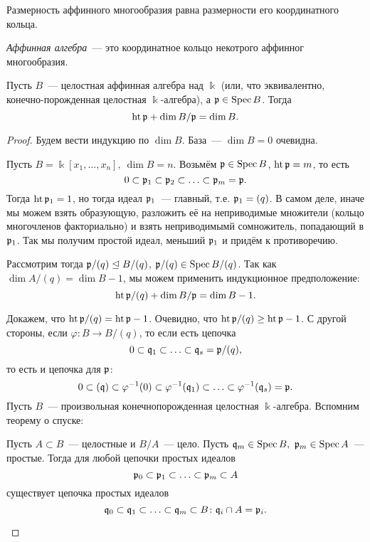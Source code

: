 
	\begin{remark}
		Размерность аффинного многообразия равна размерности его координатного кольца. 
	\end{remark}

	\begin{definition} 
		\emph{Аффинная алгебра}~--- это координатное кольцо некотрого аффинног многообразия. 
	\end{definition}

	\begin{theorem}\label{ht(p) + dim(B/p)} 
		Пусть $B$~--- целостная аффинная алгебра над $\Bbbk$ (или, что эквивалентно, конечно-порожденная целостная $\Bbbk$-алгебра), а $\mathfrak{p} \in \operatorname{Spec}{B}$. Тогда 
		\[
			\operatorname{ht}{\mathfrak{p}} + \dim{B/\mathfrak{p}} = \dim{B}.
		\]
	\end{theorem}
	\begin{proof}
		Будем вести индукцию по $\dim{B}$. База~--- $\dim{B} = 0$ очевидна. 

		 Пусть $B = \Bbbk[x_1, \ldots, x_n], \ \dim{B} = n$. Возьмём $\mathfrak{p} \in \operatorname{Spec}{B}$, $\operatorname{ht}{\mathfrak{p}} = m$, то есть 
		\[
			0 \subset \mathfrak{p}_1 \subset \mathfrak{p}_2 \subset \ldots \subset \mathfrak{p}_m = \mathfrak{p}.
		\]
		Тогда $\operatorname{ht}{\mathfrak{p}_1} = 1$, но тогда идеал $\mathfrak{p}_1$~--- главный, т.е. $\mathfrak{p}_1 = (q)$. В самом деле, иначе мы можем взять образующую, разложить её на неприводимые множители (кольцо многочленов факториально) и взять неприводимымй сомножитель, попадающий в $\mathfrak{p}_1$. Так мы получим простой идеал, меньший $\mathfrak{p}_1$ и придём к противоречию. 

		Рассмотрим тогда $\mathfrak{p}/(q) \trianglelefteq B/(q)$, $\mathfrak{p}/(q) \in \operatorname{Spec}{B/(q)}$. Так как $\dim{A/(q)} = \dim{B} - 1$, мы можем применить индукционное предположение: 
		\[
			\operatorname{ht}{\mathfrak{p}/(q)} + \dim{B/\mathfrak{p}} = \dim{B} - 1. 
		\]

		Докажем, что $\operatorname{ht}{\mathfrak{p}/(q)} = \operatorname{ht}{\mathfrak{p}} - 1$. Очевидно, что $\operatorname{ht}{\mathfrak{p}/(q)} \ge \operatorname{ht}{\mathfrak{p}} - 1$. С другой стороны, если $\varphi\colon B \to B/(q)$, то если есть цепочка 
		\[
			0 \subset \mathfrak{q}_1 \subset \ldots \subset \mathfrak{q}_{s} = \mathfrak{p}/(q),
		\]
		то есть и цепочка для $\mathfrak{p}$:
		\[
			0 \subset (\mathfrak{q}) \subset \varphi^{-1}(0) \subset \varphi^{-1}(\mathfrak{q}_{1}) \subset \ldots \subset \varphi^{-1}(\mathfrak{q}_{s}) = \mathfrak{p}.
		\]
		 Пусть $B$~--- произвольная конечнопорожденная целостная $\Bbbk$-алгебра. Вспомним теорему о спуске: 

		\begin{theorem}[О спуске] 
			Пусть $A \subset B$~--- целостные и $B/A$~--- цело. Пусть $\mathfrak{q}_{m} \in \operatorname{Spec}{B}, \ \mathfrak{p}_m \in \operatorname{Spec}{A}$~--- простые. Тогда для любой цепочки простых идеалов
			\[
				\mathfrak{p}_0 \subset \mathfrak{p}_1 \subset \ldots \subset \mathfrak{p}_m \subset A
			\]
			существует цепочка простых идеалов 
			\[
				\mathfrak{q}_0 \subset \mathfrak{q}_1 \subset \ldots \subset \mathfrak{q}_m \subset B\colon \mathfrak{q}_i \cap A = \mathfrak{p}_i.
			\]
		\end{theorem}


\end{proof}

